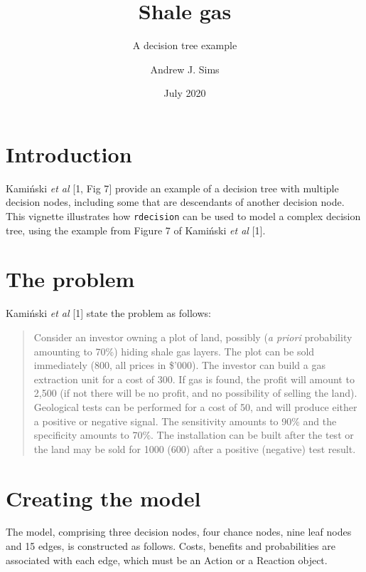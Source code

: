 \documentclass[
]{article}
\title{Shale gas}
\subtitle{A decision tree example}
\author{Andrew J. Sims}
\date{July 2020}
\begin{document}
\maketitle

\hypertarget{introduction}{%
\section{Introduction}\label{introduction}}

Kamiński \emph{et al} {[}1, Fig 7{]} provide an example of a decision
tree with multiple decision nodes, including some that are descendants
of another decision node. This vignette illustrates how
\texttt{rdecision} can be used to model a complex decision tree, using
the example from Figure 7 of Kamiński \emph{et al} {[}1{]}.

\hypertarget{the-problem}{%
\section{The problem}\label{the-problem}}

Kamiński \emph{et al} {[}1{]} state the problem as follows:

\begin{quote}
Consider an investor owning a plot of land, possibly (\emph{a priori}
probability amounting to 70\%) hiding shale gas layers. The plot can be
sold immediately (800, all prices in \$'000). The investor can build a
gas extraction unit for a cost of 300. If gas is found, the profit will
amount to 2,500 (if not there will be no profit, and no possibility of
selling the land). Geological tests can be performed for a cost of 50,
and will produce either a positive or negative signal. The sensitivity
amounts to 90\% and the specificity amounts to 70\%. The installation
can be built after the test or the land may be sold for 1000 (600) after
a positive (negative) test result.
\end{quote}

\hypertarget{creating-the-model}{%
\section{Creating the model}\label{creating-the-model}}

The model, comprising three decision nodes, four chance nodes, nine leaf
nodes and 15 edges, is constructed as follows. Costs, benefits and
probabilities are associated with each edge, which must be an Action or
a Reaction object.
\end{document}
